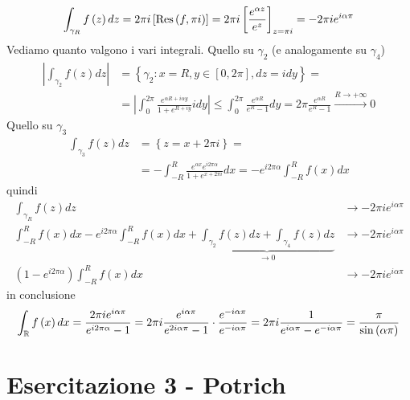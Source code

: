 \begin{equation*}
\int _{\gamma _{R}} f\left(z\right) dz = 2\pi i\left[\operatorname{Res} \left(f,\pi i\right)\right] = 2\pi i\left[\frac{e^{\alpha z}}{e^{z}}\right]_{z = \pi i} = - 2\pi ie^{i\alpha \pi }
\end{equation*}
Vediamo quanto valgono i vari integrali. Quello su $\gamma _{2}$ (e analogamente su $\gamma _{4}$)
\begin{align*}
\left| \int _{\gamma _{2}} f\left(z\right) dz\right|  & = \left\{\gamma _{2} :x = R,y\in \left[ 0,2\pi \right] ,dz = idy\right\} = \\
 & = \left| \int ^{2\pi }_{0}\frac{e^{\alpha R + i\alpha y}}{1 + e^{R + iy}} idy\right| \leqslant \int ^{2\pi }_{0}\frac{e^{\alpha R}}{e^{R} - 1} dy = 2\pi \frac{e^{\alpha R}}{e^{R} - 1}\xrightarrow{R\rightarrow + \infty } 0
\end{align*}
Quello su $\gamma _{3}$
\begin{align*}
\int _{\gamma _{3}} f\left(z\right) dz & = \left\{z = x + 2\pi i\right\} = \\
 & = - \int ^{R}_{ - R}\frac{e^{\alpha x} e^{i2\pi \alpha }}{1 + e^{x + 2\pi i}} dx = -e^{i2\pi \alpha }\int ^{R}_{ - R} f\left(x\right) dx
\end{align*}
quindi
\begin{align*}
\int _{\gamma _{R}} f\left(z\right) dz & \rightarrow - 2\pi ie^{i\alpha \pi }\\
\int ^{R}_{ - R} f\left(x\right) dx - e^{i2\pi \alpha }\int ^{R}_{ - R} f\left(x\right) dx + \underbrace{\int _{\gamma _{2}} f\left(z\right) dz + \int _{\gamma _{4}} f\left(z\right) dz}_{\rightarrow 0} & \rightarrow - 2\pi ie^{i\alpha \pi }\\
\left(1 - e^{i2\pi \alpha }\right)\int ^{R}_{ - R} f\left(x\right) dx & \rightarrow - 2\pi ie^{i\alpha \pi }
\end{align*}
in conclusione
\begin{equation*}
\int _{\mathbb{R} } f\left(x\right) dx = \frac{2\pi ie^{i\alpha \pi }}{e^{i2\pi \alpha } - 1} = 2\pi i\frac{e^{i\alpha \pi }}{e^{2i\alpha \pi } - 1} \cdot \frac{e^{ - i\alpha \pi }}{e^{ - i\alpha \pi }} = 2\pi i\frac{1}{e^{i\alpha \pi } - e^{ - i\alpha \pi }} = \frac{\pi }{\sin\left(\alpha \pi \right)}
\end{equation*}
\chapter{Esercitazione 3 - Potrich}
\ParteEsercizi
\Esercizio{}

